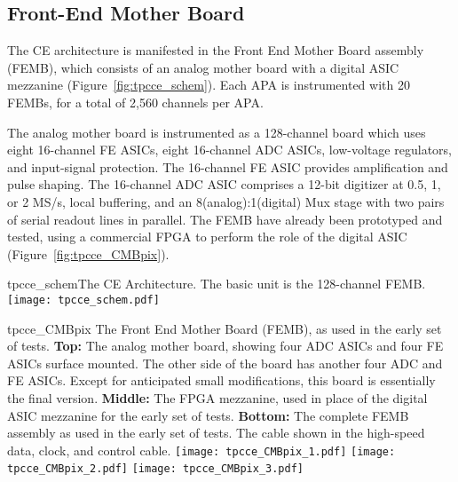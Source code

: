 %
\subsection{Front-End Mother Board}
\label{subsec:fe_arch}

The CE architecture is manifested in the Front End Mother Board assembly (FEMB),
which consists of an analog mother board with a digital ASIC mezzanine (Figure~\ref{fig:tpcce_schem}).
Each APA is instrumented with 20 FEMBs, for a total of 2,560 channels per APA.

The analog mother board is instrumented as a 128-channel board which uses eight 16-channel FE ASICs,
eight 16-channel ADC ASICs, low-voltage regulators, and input-signal protection.
The 16-channel FE ASIC provides amplification and pulse shaping.
The 16-channel ADC ASIC comprises a 12-bit digitizer at 0.5, 1, or 2 MS/s, local buffering,
and an 8(analog):1(digital) Mux stage with two pairs of serial readout lines in parallel.
The FEMB have already been prototyped and tested,
using a commercial FPGA to perform the role of the digital ASIC (Figure~\ref{fig:tpcce_CMBpix}).

\begin{cdrfigure}{tpcce_schem}{The CE Architecture. The basic unit is the 128-channel FEMB.}
\texttt{[image: tpcce\_schem.pdf]}
\end{cdrfigure}

\begin{cdrfigure}{tpcce_CMBpix}
{The Front End Mother Board (FEMB), as used in the early set of tests.
  {\bf Top:} The analog mother board, showing four ADC ASICs and four FE ASICs surface mounted.
  The other side of the board has another four ADC and FE ASICs.
  Except for anticipated small modifications, this board is essentially the final version.
  {\bf Middle:} The FPGA mezzanine, used in place of the digital ASIC mezzanine for the early set of tests.
  {\bf Bottom:} The complete FEMB assembly as used in the early set of tests.
  The cable shown in the high-speed data, clock, and control cable.}
\texttt{[image: tpcce\_CMBpix\_1.pdf]}
\texttt{[image: tpcce\_CMBpix\_2.pdf]}
\texttt{[image: tpcce\_CMBpix\_3.pdf]}
\end{cdrfigure}

